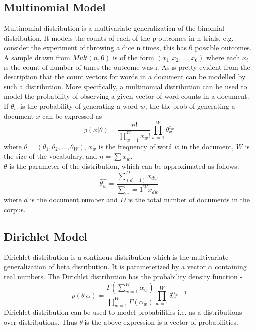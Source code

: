 \documentclass[10pt]{article}
\begin{document}
\subsection{Multinomial Model}
Multinomial distribution is a multivariate generalization of the binomial distribution. It models the counts of each of the p outcomes in n trials. e.g. consider the experiment of throwing a dice n times, this has 6 possible outcomes. A sample drawn from $Mult(n,6)$ is of the form $(x_1, x_2, \ldots, x_6)$ where each $x_i$ is the count of number of times the outcome was i. 
As is pretty evident from the description that the count vectors for words in a document can be modelled by such a distribution. More specifically, a multinomial distribution can be used to model the probability of observing a given vector of word counts in a document. If $\theta_w$ is the probability of generating a word $w$, the the prob of generating a document $x$ can be expressed as - 
\begin{equation}
p(x|\theta) = \frac{n!}{\prod_{w=1}^W x_w!} \prod_{w=1}^W \theta_w^{x_w}
\end{equation}
where $\theta = (\theta_1, \theta_2, \ldots, \theta_W)$, $x_w$ is the frequency of word $w$ in the document, $W$ is the size of the vocabulary, and $n=\sum x_w$.\\
$\theta$ is the parameter of the distribution, which can be approximated as follows\cite{MKE}:
\begin{equation}
\hat{\theta_w} = \frac{\sum_(d=1)^D x_{dw}}{\sum_w=1^W x_{dw}}
\end{equation}
where $d$ is the document number and $D$ is the total number of documents in the corpus. 

\subsection{Dirichlet Model}
Dirichlet distribution is a continous distribution which is the multivariate generalization of beta distribution. It is parameterized by a vector $\alpha$ containing real numbers. The Dirichlet distribution has the probability density function - 
\begin{equation}
p(\theta | \alpha) = \frac{\Gamma(\sum_{w=1}^W \alpha_w)}{\prod_{w=1}^W \Gamma(\alpha_w)} \prod_{w=1}^W \theta_w^{\alpha_w - 1}
\end{equation}
Dirichlet distribution can be used to model probabilities i.e. as a distributions over distributions. Thus $\theta$ is the above expression is a vector of probabilities.
\end{document}

